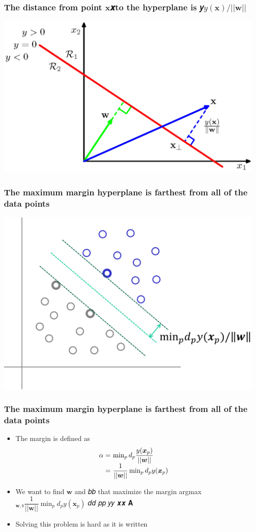 \documentclass[12pt,notes,mathserif]{beamer}
\begin{document}
\begin{frame}[c]
\frametitle{The distance from point $\bm{x}$𝒙to the hyperplane is 𝑦$y(\bm{x})/||\bm{w}||$}
\begin{center}
\includegraphics[width=0.7\linewidth]{fig8/lec818.jpg}
\end{center}
\end{frame}


\begin{frame}[c]
\frametitle{The maximum margin hyperplane is farthest from all of the data points}
\begin{center}
\includegraphics[width=0.7\linewidth]{fig8/lec819.jpg}
\end{center}
\end{frame}


\begin{frame}[c]
\frametitle{The maximum margin hyperplane is farthest from all of the data points}
\begin{itemize}
\item The margin is defined as
\[
\begin{array}{r@{~}l}
\alpha=&\min_pd_p\dfrac{y(\bm{x}_p)}{||\bm{w}||}\\
=&\dfrac{1}{||\bm{w}||}\min_pd_py(\bm{x}_p)
\end{array}
\]
\item We want to find $\bm{w}$ and 𝑏𝑏 that maximize the margin argmax$_{\bm{w},b}\dfrac{1}{||\bm{w}||} \min_pd_py(\bm{x}_p)$ 𝑑𝑑 𝑝𝑝 𝑦𝑦 𝒙𝒙 𝐀
\item Solving this problem is hard as it is written
\end{itemize}
\end{frame}
\end{document}
